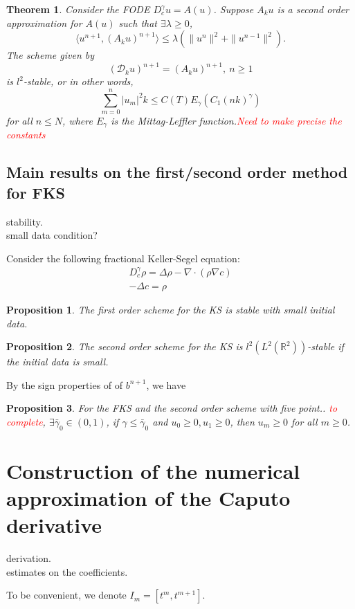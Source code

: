 \documentclass[11pt]{article} %
\newcommand{\tcr}[1]{\textcolor{red}{#1}}
\newtheorem{thm}{Theorem}
\newtheorem{pro}{Proposition}
\begin{document}
\begin{thm}
Consider the FODE $D_c^{\gamma}u=A(u)$. Suppose $A_ku$ is a second order approximation for $A(u)$ such that $\exists\lambda\ge 0$, $$
\langle u^{n+1}, (A_ku)^{n+1}\rangle \le \lambda(\|u^{n}\|^2+\|u^{n-1}\|^2).
$$
The scheme given by
$$
(\mathcal{D}_ku)^{n+1}=(A_ku)^{n+1}, \ n\ge 1
$$
is $l^2$-stable, or in other words, $$
\sum_{m=0}^n |u_m|^2k\le C(T)E_{\gamma}(C_1(nk)^{\gamma})
$$
for all $n\le N$, where $E_{\gamma}$ is the Mittag-Leffler function.\tcr{Need to make precise the constants}
\end{thm}



\subsection{Main results on the first/second order method for FKS}
stability.\\
small data condition?

Consider the following fractional Keller-Segel equation:
\begin{gather*}
D_c^{\gamma}\rho=\Delta\rho-\nabla\cdot(\rho\nabla c)\\
-\Delta c=\rho
\end{gather*}

\begin{pro}
The first order scheme for the KS is stable with small initial data.
\end{pro}


\begin{pro}
The second order scheme for the KS is $l^2(L^2(\mathbb{R}^2))$-stable if the initial data is small.
\end{pro}


By the sign properties of of $b^{n+1}$, we have 
\begin{pro}
For the FKS and the second order scheme with five point.. \tcr{to complete},
$\exists \bar{\gamma}_0\in (0, 1)$, if $\gamma\le\bar{\gamma}_0$ and $u_0\ge 0, u_1\ge 0$, then $u_m\ge 0$ for all $m\ge 0$.
\end{pro}

\section{Construction of the numerical approximation of the Caputo derivative}
derivation.  \\
estimates on the coefficients.

To be convenient, we denote $I_m=[t^m, t^{m+1}]$.
\end{document}
